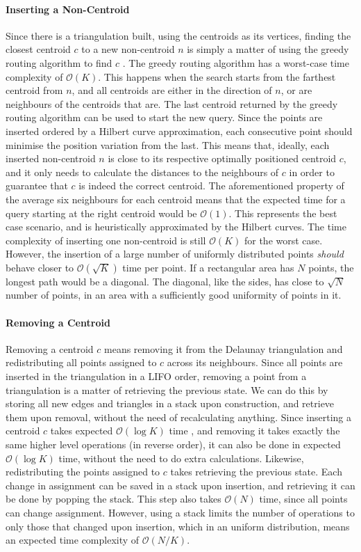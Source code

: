 \paragraph{Inserting a Non-Centroid}
Since there is a triangulation built, using the centroids as its vertices, finding the closest centroid $c$ to a new non-centroid $n$ is simply a matter of using the greedy routing algorithm to find $c$ \cite{greedyroute}.
The greedy routing algorithm has a worst-case time complexity of $\mathcal{O}(K)$. This happens when the search starts from the farthest centroid from $n$, and all centroids are either in the direction of $n$, or are neighbours of the centroids that are. 
The last centroid returned by the greedy routing algorithm can be used to start the new query. Since the points are inserted ordered by a Hilbert curve approximation, each consecutive point should minimise the position variation from the last.
This means that, ideally, each inserted non-centroid $n$ is close to its respective optimally positioned centroid $c$, and it only needs to calculate the distances to the neighbours of $c$ in order to guarantee that $c$ is indeed the correct centroid.
The aforementioned property of the average six neighbours for each centroid means that the expected time for a query starting at the right centroid would be $\mathcal{O}(1)$. This represents the best case scenario, and is heuristically approximated by the Hilbert curves. The time complexity of inserting one non-centroid is still $\mathcal{O}(K)$ for the worst case. 
However, the insertion of a large number of uniformly distributed points \emph{should} behave closer to $\mathcal{O}(\sqrt{K})$ time per point. If a rectangular area has $N$ points, the longest path would be a diagonal. The diagonal, like the sides, has close to $\sqrt{N}$ number of points, in an area with a sufficiently good uniformity of points in it.

\paragraph{Removing a Centroid}
Removing a centroid $c$ means removing it from the Delaunay triangulation and redistributing all points assigned to $c$ across its neighbours.
Since all points are inserted in the triangulation in a LIFO order, removing a point from a triangulation is a matter of retrieving the previous state. We can do this by storing all new edges and triangles in a stack upon construction, and retrieve them upon removal, without the need of recalculating anything. Since inserting a centroid $c$ takes expected $\mathcal{O}(\log{K})$ time \cite{tricomplex}, and removing it takes exactly the same higher level operations (in reverse order), it can also be done in expected $\mathcal{O}(\log{K})$ time, without the need to do extra calculations.
Likewise, redistributing the points assigned to $c$ takes retrieving the previous state. Each change in assignment can be saved in a stack upon insertion, and retrieving it can be done by popping the stack.
This step also takes $\mathcal{O}(N)$ time, since all points can change assignment. However, using a stack limits the number of operations to only those that changed upon insertion, which in an uniform distribution, means an expected time complexity of $\mathcal{O}(N/K)$.

